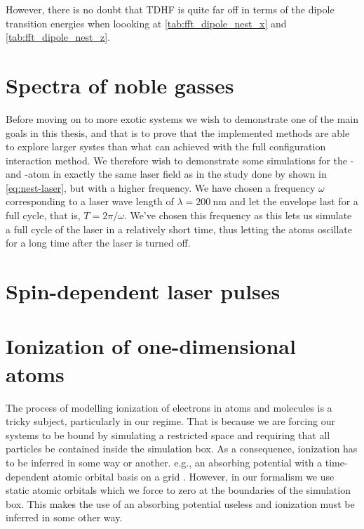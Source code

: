         However, there is no doubt that TDHF is quite far off in terms of the
        dipole transition energies when loooking at
        \autoref{tab:fft_dipole_nest_x} and \autoref{tab:fft_dipole_nest_z}.


    \section{Spectra of noble gasses}
        Before moving on to more exotic systems we wish to demonstrate one of
        the main goals in this thesis, and that is to prove that the implemented
        methods are able to explore larger systes than what can achieved with
        the full configuration interaction method.
        We therefore wish to demonstrate some simulations for the - and
        -atom in exactly the same laser field as in the study done by
        \citeauthor{nest} \cite{nest} shown in \autoref{eq:nest-laser}, but with
        a higher frequency.
        We have chosen a frequency $\omega$ corresponding to a laser wave length
        of $\lambda = \SI{200}{\nm}$ and let the envelope last for a full cycle,
        that is, $T = 2\pi / \omega$.
        We've chosen this frequency as this lets us simulate a full cycle of the
        laser in a relatively short time, thus letting the atoms oscillate for a
        long time after the laser is turned off.

    \section{Spin-dependent laser pulses}

    \section{Ionization of one-dimensional atoms}
        The process of modelling ionization of electrons in atoms and
        molecules is a tricky subject, particularly in our regime.
        That is because we are forcing our systems to be bound by simulating a
        restricted space and requiring that all particles be contained inside
        the simulation box.
        As a consequence, ionization has to be inferred in some way or another.
        e.g., an absorbing potential with a time-dependent atomic orbital basis
        on a grid \cite{kosloff1986363, miyagi_and_madsen, takeshi}.
        However, in our formalism we use static atomic orbitals which we
        force to zero at the boundaries of the simulation box.
        This makes the use of an absorbing potential useless and ionization
        must be inferred in some other way.

